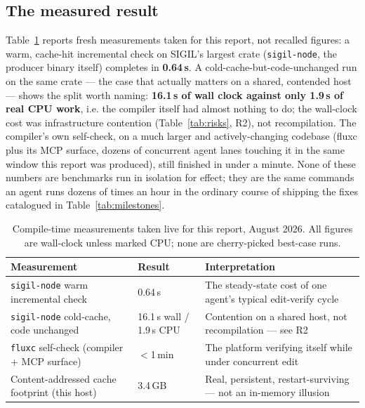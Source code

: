 \subsection{The measured result}

Table~\ref{tab:compiletimes} reports fresh measurements taken for this report, not recalled figures: a warm, cache-hit incremental check on SIGIL's largest crate (\texttt{sigil-node}, the producer binary itself) completes in \textbf{0.64\,s}. A cold-cache-but-code-unchanged run on the same crate --- the case that actually matters on a shared, contended host --- shows the split worth naming: \textbf{16.1\,s of wall clock against only 1.9\,s of real CPU work}, i.e. the compiler itself had almost nothing to do; the wall-clock cost was infrastructure contention (Table~\ref{tab:risks}, R2), not recompilation. The compiler's own self-check, on a much larger and actively-changing codebase (fluxc plus its MCP surface, dozens of concurrent agent lanes touching it in the same window this report was produced), still finished in under a minute. None of these numbers are benchmarks run in isolation for effect; they are the same commands an agent runs dozens of times an hour in the ordinary course of shipping the fixes catalogued in Table~\ref{tab:milestones}.

\begin{table}[h]
\centering
\small
\begin{tabular}{@{}p{5.4cm}p{3.0cm}p{6.0cm}@{}}
\toprule
\textbf{Measurement} & \textbf{Result} & \textbf{Interpretation} \\
\midrule
\texttt{sigil-node} warm incremental check & 0.64\,s & The steady-state cost of one agent's typical edit-verify cycle \\
\texttt{sigil-node} cold-cache, code unchanged & 16.1\,s wall / 1.9\,s CPU & Contention on a shared host, not recompilation --- see R2 \\
\texttt{fluxc} self-check (compiler + MCP surface) & $<$1\,min & The platform verifying itself while under concurrent edit \\
Content-addressed cache footprint (this host) & 3.4\,GB & Real, persistent, restart-surviving --- not an in-memory illusion \\
\bottomrule
\end{tabular}
\caption{Compile-time measurements taken live for this report, August 2026. All figures are wall-clock unless marked CPU; none are cherry-picked best-case runs.}
\label{tab:compiletimes}
\end{table}

